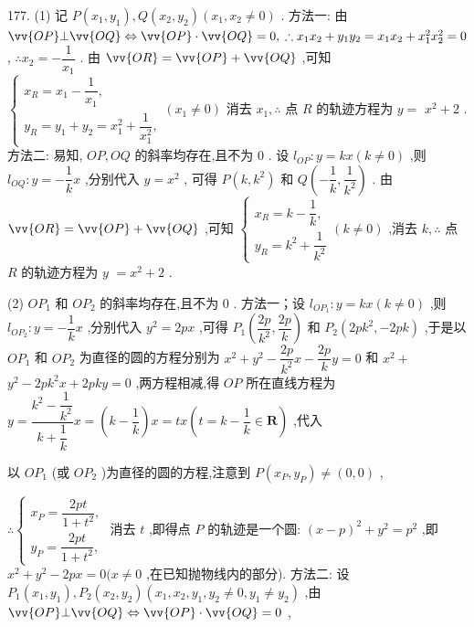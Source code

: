 177. (1) 记 $P\left( {{x}_{1},{y}_{1}}\right) ,Q\left( {{x}_{2},{y}_{2}}\right) \left( {{x}_{1},{x}_{2} \neq  0}\right)$ . 方法一: 由 $\vv{OP}\bot \vv{OQ} \Leftrightarrow  \vv{OP} \cdot  \vv{OQ} = 0,\;\therefore {x}_{1}{x}_{2} + {y}_{1}{y}_{2} = {x}_{1}{x}_{2} + {x}_{1}^{2}{x}_{2}^{2} = 0$ , $\therefore {x}_{2} =  - \dfrac{1}{{x}_{1}}$ . 由 $\vv{OR} = \vv{OP} + \vv{OQ}$ ,可知 $\left\{  {\begin{array}{l} {x}_{R} = {x}_{1} - \dfrac{1}{{x}_{1}}, \\  {y}_{R} = {y}_{1} + {y}_{2} = {x}_{1}^{2} + \dfrac{1}{{x}_{1}^{2}}, \end{array}\left( {{x}_{1} \neq  0}\right) }\right.$ 消去 ${x}_{1},\therefore$ 点 $R$ 的轨迹方程为 $y =$  ${x}^{2} + 2$ . 方法二: 易知, ${OP},{OQ}$ 的斜率均存在,且不为 0 . 设 ${l}_{OP} : y = {kx}\left( {k \neq  0}\right)$ ,则 ${l}_{OQ} : y =  - \dfrac{1}{k}x$ ,分别代入 $y = {x}^{2}$ , 可得 $P\left( {k,{k}^{2}}\right)$ 和 $Q\left( {-\dfrac{1}{k},\dfrac{1}{{k}^{2}}}\right)$ . 由 $\vv{OR} = \vv{OP} + \vv{OQ}$ ,可知 $\left\{  {\begin{array}{l} {x}_{R} = k - \dfrac{1}{k}, \\  {y}_{R} = {k}^{2} + \dfrac{1}{{k}^{2}} \end{array}\left( {k \neq  0}\right) }\right.$ ,消去 $k,\therefore$ 点 $R$ 的轨迹方程为 $y$  $= {x}^{2} + 2$ .

(2) $O{P}_{1}$ 和 $O{P}_{2}$ 的斜率均存在,且不为 0 . 方法一；设 ${l}_{O{P}_{1}} : y = {kx}\left( {k \neq  0}\right)$ ,则 ${l}_{O{P}_{2}} : y =  - \dfrac{1}{k}x$ ,分别代入 ${y}^{2} = {2px}$ ,可得 ${P}_{1}\left( {\dfrac{2p}{{k}^{2}},\dfrac{2p}{k}}\right)$ 和 ${P}_{2}\left( {{2p}{k}^{2}, - {2pk}}\right)$ ,于是以 $O{P}_{1}$ 和 $O{P}_{2}$ 为直径的圆的方程分别为 ${x}^{2} + {y}^{2} - \dfrac{2p}{{k}^{2}}x - \dfrac{2p}{k}y = 0$ 和 ${x}^{2} +$  ${y}^{2} - {2p}{k}^{2}x + {2pky} = 0$ ,两方程相减,得 ${OP}$ 所在直线方程为 $y = \dfrac{{k}^{2} - \dfrac{1}{{k}^{2}}}{k + \dfrac{1}{k}}x = \left( {k - \dfrac{1}{k}}\right) x = {tx}\left( {t = k - \dfrac{1}{k} \in  \mathbf{R}}\right)$ ,代入

以 $O{P}_{1}$ (或 $O{P}_{2}$ )为直径的圆的方程,注意到 $P\left( {{x}_{P},{y}_{P}}\right)  \neq  \left( {0,0}\right)$ ,

$\therefore \left\{  \begin{array}{l} {x}_{P} = \dfrac{2pt}{1 + {t}^{2}}, \\  {y}_{P} = \dfrac{2pt}{1 + {t}^{2}}, \end{array}\right.$ 消去 $t$ ,即得点 $P$ 的轨迹是一个圆: ${\left( x - p\right) }^{2} + {y}^{2} = {p}^{2}$ ,即 ${x}^{2} + {y}^{2} - {2px} = 0(x \neq  0$ ,在已知抛物线内的部分). 方法二: 设 ${P}_{1}\left( {{x}_{1},{y}_{1}}\right) ,{P}_{2}\left( {{x}_{2},{y}_{2}}\right) \left( {{x}_{1},{x}_{2},{y}_{1},{y}_{2} \neq  0,{y}_{1} \neq  {y}_{2}}\right)$ ,由 $\vv{OP} \bot  \vv{OQ} \Leftrightarrow  \vv{OP} \cdot  \vv{OQ} = 0$ ,

